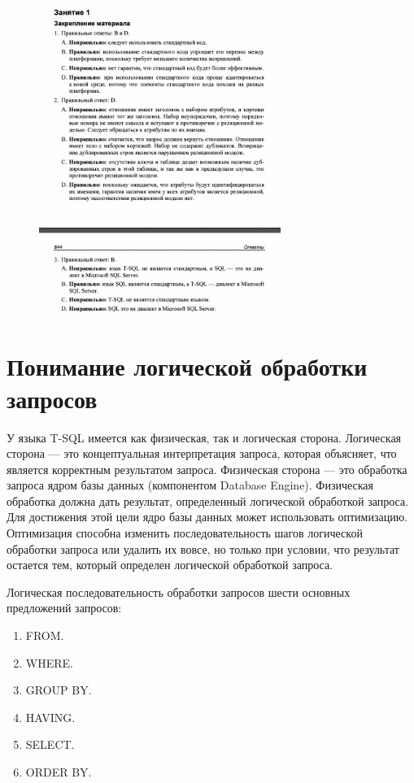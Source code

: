 \begin{figure}[h!]
	\begin{center}
		\includegraphics[width=0.7\textwidth]{img/ans1.png}
	\end{center}
	\captionsetup{justification=centering}
\end{figure}




\section{Понимание логической обработки запросов}
У языка T-SQL имеется как физическая, так и логическая сторона. Логическая сторона — это концептуальная интерпретация запроса, которая объясняет, что является корректным результатом запроса. Физическая сторона — это обработка запроса
ядром базы данных (компонентом Database Engine). Физическая обработка должна
дать результат, определенный логической обработкой запроса. Для достижения
этой цели ядро базы данных может использовать оптимизацию. Оптимизация
способна изменить последовательность шагов логической обработки запроса или
удалить их вовсе, но только при условии, что результат остается тем, который
определен логической обработкой запроса.

Логическая последовательность обработки запросов шести основных предложений запросов: 

\begin{enumerate}
	\item FROM.
	\item WHERE.
	\item GROUP BY.
	\item HAVING.
	\item SELECT.
	\item ORDER BY.
\end{enumerate}

